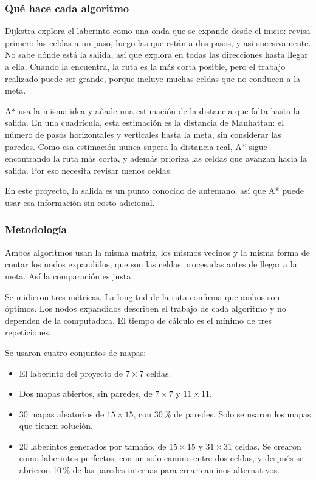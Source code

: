 \documentclass[11pt,a4paper]{article}
\begin{document}
\subsubsection*{Qué hace cada algoritmo}
Dijkstra explora el laberinto como una onda que se expande desde el inicio: revisa primero las celdas a un paso, luego las que están a dos pasos, y así sucesivamente. No sabe dónde está la salida, así que explora en todas las direcciones hasta llegar a ella. Cuando la encuentra, la ruta es la más corta posible, pero el trabajo realizado puede ser grande, porque incluye muchas celdas que no conducen a la meta.

A* usa la misma idea y añade una estimación de la distancia que falta hasta la salida. En una cuadrícula, esta estimación es la distancia de Manhattan: el número de pasos horizontales y verticales hasta la meta, sin considerar las paredes. Como esa estimación nunca supera la distancia real, A* sigue encontrando la ruta más corta, y además prioriza las celdas que avanzan hacia la salida. Por eso necesita revisar menos celdas.

En este proyecto, la salida es un punto conocido de antemano, así que A* puede usar esa información sin costo adicional.

\subsubsection*{Metodología}
Ambos algoritmos usan la misma matriz, los mismos vecinos y la misma forma de contar los nodos expandidos, que son las celdas procesadas antes de llegar a la meta. Así la comparación es justa.

Se midieron tres métricas. La longitud de la ruta confirma que ambos son óptimos. Los nodos expandidos describen el trabajo de cada algoritmo y no dependen de la computadora. El tiempo de cálculo es el mínimo de tres repeticiones.

Se usaron cuatro conjuntos de mapas:
\begin{itemize}
    \item El laberinto del proyecto de $7 \times 7$ celdas.
    \item Dos mapas abiertos, sin paredes, de $7 \times 7$ y $11 \times 11$.
    \item 30 mapas aleatorios de $15 \times 15$, con 30\,\% de paredes. Solo se usaron los mapas que tienen solución.
    \item 20 laberintos generados por tamaño, de $15 \times 15$ y $31 \times 31$ celdas. Se crearon como laberintos perfectos, con un solo camino entre dos celdas, y después se abrieron 10\,\% de las paredes internas para crear caminos alternativos.
\end{itemize}
\end{document}
